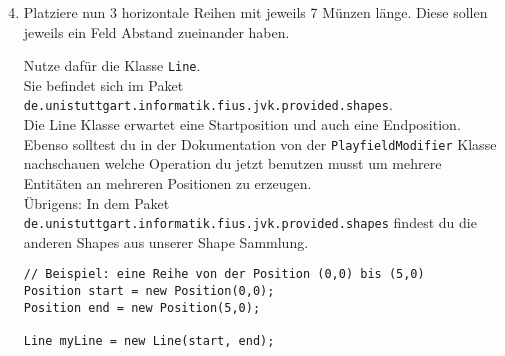\begin{enumerate} \setcounter{enumi}{3}
    \item Platziere nun 3 horizontale Reihen mit jeweils 7 Münzen länge.
        Diese sollen jeweils ein Feld Abstand zueinander haben.

        Nutze dafür die Klasse \lstinline{Line}.\\
        Sie befindet sich im Paket \texttt{de.unistuttgart.informatik.fius.jvk.provided.shapes}.\\

        Die Line Klasse erwartet eine Startposition und auch eine Endposition.\\
        Ebenso solltest du in der Dokumentation von der \lstinline{PlayfieldModifier} Klasse nachschauen welche Operation du jetzt benutzen musst um mehrere Entitäten an mehreren Positionen zu erzeugen.\\

        Übrigens: In dem Paket \texttt{de.unistuttgart.informatik.fius.jvk.provided.shapes} findest du die anderen Shapes aus unserer Shape Sammlung.

    \begin{lstlisting}
// Beispiel: eine Reihe von der Position (0,0) bis (5,0)
Position start = new Position(0,0);
Position end = new Position(5,0);

Line myLine = new Line(start, end);
    \end{lstlisting}

\end{enumerate}

\newpage
